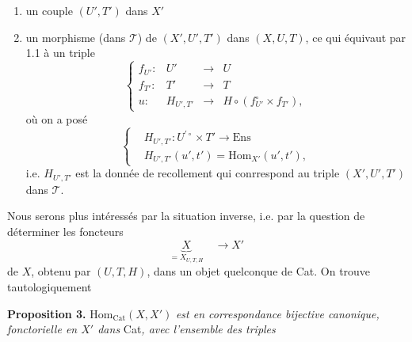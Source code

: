 \documentclass[11pt]{article}
\newcommand{\msp}[1]{\marginpar{\footnotesize [#1]}}
\begin{document}
\begin{enumerate}[label={}]
\item[$1^\circ$)] un couple $(U',T')$ dans $X'$
\item[$2^\circ$)] un morphisme (dans $\mathcal{T}$) de $(X',U',T')$ dans $(X,U,T)$, ce qui équivaut par 1.1 à un triple
\[
\left\{\begin{array}{rccl}
f_{U'} : & U' & \longrightarrow & U\\[1ex]
f_{T'} : & T' & \longrightarrow & T\\[1ex]
u : & H_{U',T'} & \longrightarrow & H \circ (f_{U'}^\circ \times f_{T'}),
\end{array}\right.
\]
où on a posé
\[
\left\{\begin{aligned}
&H_{U',T'} : U^{\prime\circ} \times T' \longrightarrow \mathrm{Ens}\\[1ex]
&H_{U',T'}(u',t') = \mathrm{Hom}_{X'}(u',t'),
\end{aligned}\right.
\]
i.e. $H_{U',T'}$ est la donnée de recollement qui conrrespond au triple $(X',U',T')$ dans $\mathcal{T}$. %
\end{enumerate}

\msp{page 66}

Nous serons plus intéressés par la situation inverse, i.e. par la question de déterminer les foncteurs
\[
\underbrace{X}_{= X_{U,T,H}} \quad \longrightarrow X'
\]
de $X$, obtenu par $(U,T,H)$, dans un objet quelconque de Cat. On trouve tautologiquement

\textbf{Proposition 3.} $\mathrm{Hom}_{\mathrm{Cat}}(X,X')$ \textit{est en correspondance bijective canonique, fonctorielle en $X'$ dans} Cat\textit{, avec l'ensemble des triples}
\end{document}
